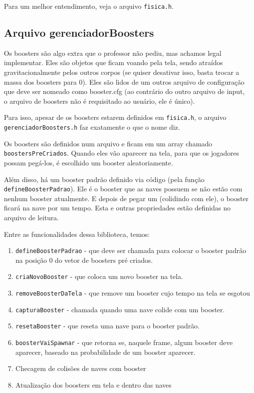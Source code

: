 \documentclass[12pt, a4paper]{article}
\begin{document}
    Para um melhor entendimento, veja o arquivo \texttt{fisica.h}.

    \subsection{Arquivo gerenciadorBoosters}
    \label{booster}
    
    Os boosters são algo extra que o professor não pediu, mas achamos legal
    implementar. Eles são objetos que ficam voando pela tela, sendo atraídos
    gravitacionalmente pelos outros corpos (se quiser desativar isso, basta
    trocar a massa dos boosters para 0). Eles são lidos de um outros arquivo
    de configuração que deve ser nomeado como booster.cfg (ao contrário
    do outro arquivo de input, o arquivo de boosters não é requisitado
    ao usuário, ele é único).

    Para isso, apesar de os boosters estarem definidos em \texttt{fisica.h},
    o arquivo \texttt{gerenciadorBoosters.h} faz exatamente o que o nome diz.

    Os boosters são definidos num arquivo e ficam em um array chamado 
    \texttt{boostersPreCriados}. Quando eles vão aparecer na tela, para
    que os jogadores possam pegá-los, é escolhido um booster aleatoriamente.

    Além disso, há um booster padrão definido via código (pela função
    \texttt{defineBoosterPadrao}). Ele é o booster que as naves possuem
    se não estão com nenhum booster atualmente. E depois de pegar um (colidindo
    com ele), o booster ficará na nave por um tempo. Esta e outras propriedades
    estão definidas no arquivo de leitura.

    Entre as funcionalidades dessa biblioteca, temos:
    \begin{enumerate}
        \item \texttt{defineBoosterPadrao} - que deve ser chamada para colocar o
        booster padrão na posição 0 do vetor de boosters pré criados.

        \item \texttt{criaNovoBooster} - que coloca um novo booster na tela.
        
        \item \texttt{removeBoosterDaTela} - que remove um booster cujo tempo
        na tela se esgotou
        \item \texttt{capturaBooster} - chamada quando uma nave colide com um booster.
        \item \texttt{resetaBooster} - que reseta uma nave para o booster padrão.
        \item \texttt{boosterVaiSpawnar} - que retorna se, naquele frame, algum booster 
        deve aparecer, baseado na probabilidade de um booster aparecer.
        \item Checagem de colisões de naves com booster
        \item Atualização dos boosters em tela e dentro das naves
    \end{enumerate}
\end{document}
